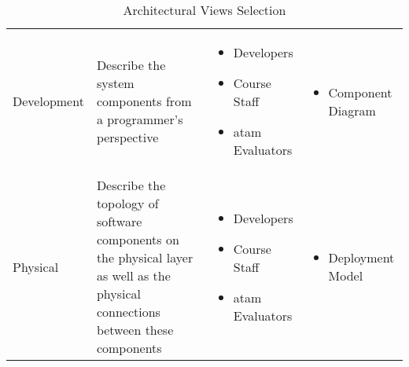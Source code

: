 \begin{table}[ht]
\begin{tabularx}{\textwidth}{p{2cm}Xp{4cm}p{4cm}}
				Development & Describe the system components from a programmer's perspective &
				\begin{minipage}[t]{\textwidth}
					\begin{itemize}[noitemsep, leftmargin=15pt]
						\item Developers
						\item Course Staff
						\item \gls{atam} Evaluators
					\end{itemize}
				\end{minipage}
				&
				\begin{minipage}[t]{\textwidth}
					\begin{itemize}[noitemsep, leftmargin=10pt]
						\item Component Diagram
					\end{itemize}
				\end{minipage} \\

				Physical & Describe the topology of software components on the physical layer as well as the physical connections between these components &
				\begin{minipage}[t]{\textwidth}
					\begin{itemize}[noitemsep, leftmargin=15pt]
						\item Developers
						\item Course Staff
						\item \gls{atam} Evaluators
					\end{itemize}
				\end{minipage}
				&
				\begin{minipage}[t]{\textwidth}
					\begin{itemize}[noitemsep, leftmargin=10pt]
						\item Deployment Model
					\end{itemize}
				\end{minipage} \\
			\bottomrule
		\end{tabularx}
		\caption{Architectural Views Selection}
		\label{tab:viewSelection}
	\end{table}
\egroup
